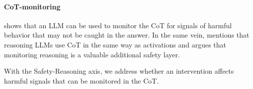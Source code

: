\paragraph{CoT-monitoring}
\citep{baker2025cotmonitoring} shows that an LLM can be used to monitor the CoT for signals of harmful behavior that may not be caught in the answer. In the same vein, \citep{korbak2025monitorability} mentions that reasoning LLMs use CoT in the same way as activations and argues that monitoring reasoning is a valuable additional safety layer.

With the Safety-Reasoning axis, we address whether an intervention affects harmful signals that can be monitored in the CoT.

